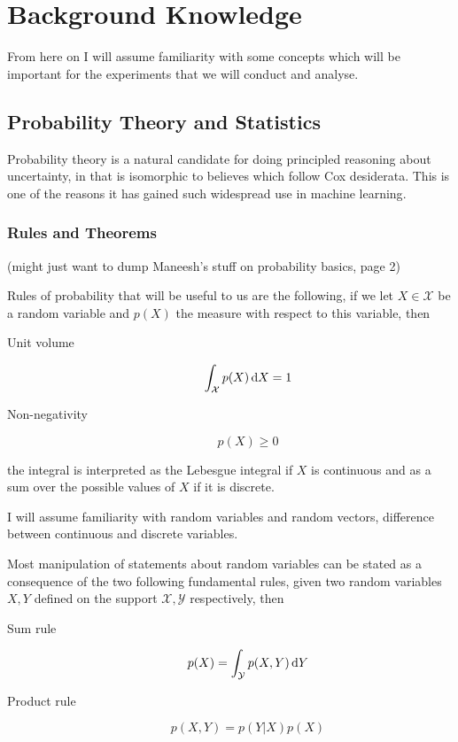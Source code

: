 \chapter{Background Knowledge}
\label{BackgroundKnowledgeCh}

From here on I will assume familiarity with some concepts which will be
important for the experiments that we will conduct and analyse.

\section{Probability Theory and Statistics}

Probability theory is a natural candidate for doing principled reasoning about
uncertainty, in that is isomorphic to believes which follow Cox desiderata. This
is one of the reasons it has gained such widespread use in machine learning\cite[p.~3-23]{jaynes2003probability}.

\subsection{Rules and Theorems}
(might just want to dump Maneesh's stuff on probability basics, page 2)

Rules of probability that will be useful to us are the following, if we let $X
\in \mathcal{X}$ be a random variable and $p(X)$ the measure with respect to
this variable, then
\begin{description}
\item[Unit volume]
  \begin{equation}
    \label{eq:unit_vol_prob_axiom}
    \int_{\mathcal{X}}p(X) \dif X = 1
  \end{equation}
\item[Non-negativity]
  \begin{equation}
    \label{eq:non_neg_of_prob}
    p(X) \geq 0
  \end{equation}
\end{description}
the integral is interpreted as the Lebesgue integral if $X$ is continuous and as
a sum over the possible values of $X$ if it is discrete.

I will assume familiarity with random variables and random vectors, difference
between continuous and discrete variables.

Most manipulation of statements about random variables can be stated as a consequence
of the two following fundamental rules, given two random variables $X, Y$
defined on the support $\mathcal{X}, \mathcal{Y}$ respectively, then
\begin{description}
\item[Sum rule]
  \begin{equation}
    \label{eq:sum_rule}
    p(X) = \int_{\mathcal{Y}}p(X, Y) \dif Y
  \end{equation}
\item[Product rule]
  \begin{equation}
    \label{eq:product_rule}
    p(X, Y) = p(Y | X)p(X)
  \end{equation}
\end{description}

